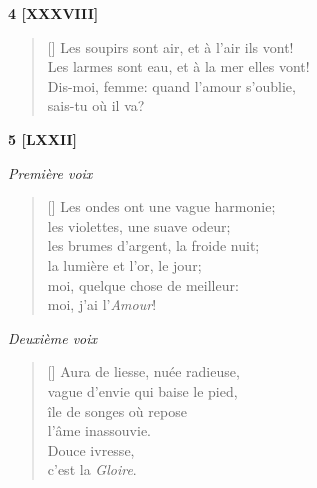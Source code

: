 \documentclass[a4paper,12pt]{book}
\begin{document}
\begin{center}
  \textbf{4 [XXXVIII]}
\end{center}

\settowidth{\versewidth}{Les larmes sont eau, et à la mer elles vont!}

\begin{verse}[\versewidth]
  Les soupirs sont air, et à l'air ils vont! \\
  Les larmes sont eau, et à la mer elles vont! \\
  Dis-moi, femme: quand l'amour s'oublie, \\
  sais-tu où il va?
\end{verse}

\bigskip

\begin{center}
  \textbf{5 [LXXII]}
\end{center}


\begin{center} \emph{Première voix} \end{center}

\begin{verse}[\versewidth]
  Les ondes ont une vague harmonie; \\
  les violettes, une suave odeur; \\
  les brumes d'argent, la froide nuit; \\
  la lumière et l'or, le jour; \\
  moi, quelque chose de meilleur: \\
  moi, j'ai l'\emph{Amour}!
\end{verse}

\smallskip

\begin{center} \emph{Deuxième voix} \end{center}

\begin{verse}[\versewidth]
  Aura de liesse, nuée radieuse, \\
  vague d'envie qui baise le pied, \\
  île de songes où repose \\
  l'âme inassouvie. \\
  Douce ivresse, \\
  c'est la \emph{Gloire}.
\end{verse}
\end{document}

